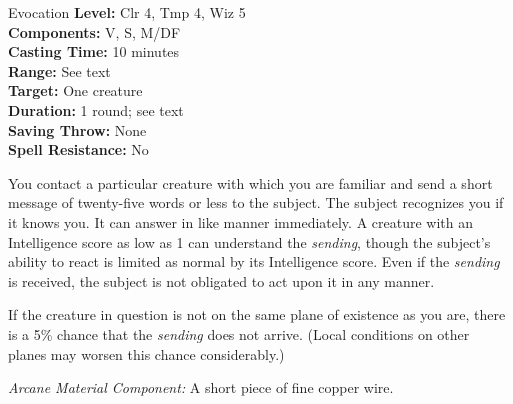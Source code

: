 {Evocation}
{
	\textbf{Level:}
	Clr 4, Tmp 4, Wiz 5\\
	\textbf{Components:}
	V, S, M/DF\\
	\textbf{Casting Time:}
	10 minutes\\
	\textbf{Range:}
	See text\\
	\textbf{Target:}
	One creature\\
	\textbf{Duration:}
	1 round; see text\\
	\textbf{Saving Throw:}
	None\\
	\textbf{Spell Resistance:}
	No\\
}
{
	You contact a particular creature with which you are familiar and send a short message of twenty-five words or less to the subject. The subject recognizes you if it knows you. It can answer in like manner immediately. A creature with an Intelligence score as low as 1 can understand the \emph{sending}, though the subject's ability to react is limited as normal by its Intelligence score. Even if the \emph{sending} is received, the subject is not obligated to act upon it in any manner.

	If the creature in question is not on the same plane of existence as you are, there is a 5\% chance that the \emph{sending} does not arrive. (Local conditions on other planes may worsen this chance considerably.)

	\textit{Arcane Material Component:}
	A short piece of fine copper wire.

}
